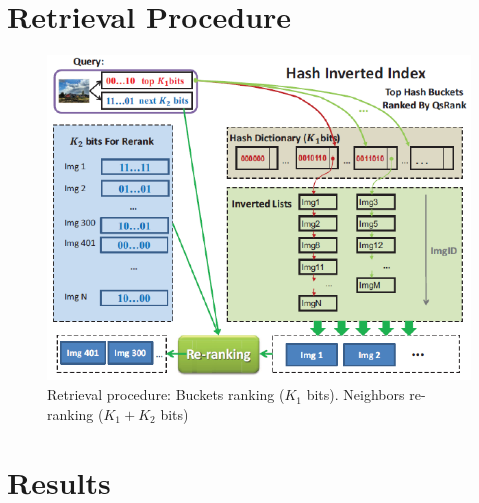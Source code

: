 \documentclass[english]{beamer}
\theoremstyle{plain}
\theoremstyle{remark}
\begin{document}
\section{Retrieval Procedure}

\begin{frame}
\begin{figure}[htbp]
	\begin{center}
	\includegraphics[width=.6\linewidth]{Images/algo.png}
	\caption{Retrieval procedure: Buckets ranking ($K_1$ bits). Neighbors re-ranking ($K_1+K_2$ bits)}
	\end{center}
	\label{fig:algo}
\end{figure}
\end{frame}

\section{Results}
\end{document}
